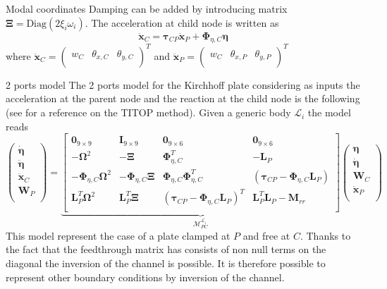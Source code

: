 \documentclass{beamer}
\begin{document}
\begin{frame}{Modal coordinates}
 Damping can be added by introducing matrix $\bm{\Xi}= \text{Diag}(2 \xi_i \omega_i)$.
The acceleration at child node is written as 
\begin{equation*}
	\ddot{\bm{x}}_C = \bm{\tau}_{CP}\ddot{\bm{x}}_P + \bm\Phi_{\eta, C} \bm{\eta}
\end{equation*}
where $\ddot{\bm{x}}_C = \begin{pmatrix}
w_C &\theta_{x, C}&\theta_{y, C} \\
\end{pmatrix}^T$ and $\ddot{\bm{x}}_P = \begin{pmatrix}
w_C &\theta_{x, P}&\theta_{y, P} \\
\end{pmatrix}^T$
\end{frame}

\begin{frame}{2 ports model}
The 2 ports model for the Kirchhoff plate considering as inputs the acceleration at the parent node and the reaction at the child node is the following (see \cite{chebbi:hal-01405184} for a reference on the TITOP method). Given a generic body $\mathcal{L}_i$ the model reads
\footnotesize{
\begin{equation*}
\begin{pmatrix}
\dot{\bm\eta} \\
\ddot{\bm\eta} \\
\hline \ddot{\bm{x}}_C \\
\bm{W}_P \\
\end{pmatrix} = 
\underbrace{\left[
\begin{array}{cc|cc}
\bm{0}_{9 \times 9} & \bm{I}_{9 \times 9} & \bm{0}_{9 \times 6} & \bm{0}_{9 \times 6} \\
-\bm{\Omega}^2 & -\bm{\Xi}  & \bm\Phi_{\eta, C}^T & -\bm{L}_P  \\
\hline
-\bm\Phi_{\eta, C}\bm{\Omega}^2 & -\bm\Phi_{\eta, C}\bm{\Xi} &  \bm\Phi_{\eta, C}  \bm\Phi_{\eta, C}^T & \left(\bm{\tau}_{CP} - \bm\Phi_{\eta, C} \bm{L}_P \right)  \\
\bm{L}_P^T \bm{\Omega}^2 & \bm{L}_P^T \bm{\Xi} &  \left(\bm{\tau}_{CP} - \bm\Phi_{\eta, C} \bm{L}_P \right)^T & \bm{L}_P^T \bm{L}_P - \bm{M}_{rr} \\	
\end{array}
\right]}_{\mathcal{M}_{PC}^{\mathcal{L}_i}}	\begin{pmatrix}
\bm{\eta} \\
\dot{\bm\eta} \\
\hline \bm{W}_C \\
\ddot{\bm{x}}_P \\
\end{pmatrix}
\end{equation*}
}
This model represent the case of a plate clamped at $P$ and free at $C$. Thanks to the fact that the feedthrough matrix has consists of non null terms on the diagonal the inversion of the channel is possible. It is therefore possible to represent other boundary conditions by inversion of the channel. 

\end{frame}
\end{document}
